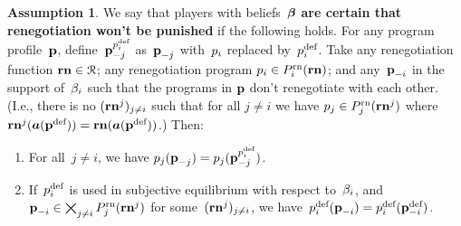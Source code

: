 \documentclass[sigconf]{aamas}
\theoremstyle{definition}
\newtheorem{assumption}[definition]{Assumption}
\begin{document}
\begin{assumption}
We say that players with beliefs~$\boldsymbol{\beta}$
\textbf{are certain 
that renegotiation won't be punished}
if the following holds. For any program profile~$\textbf{p}$, define~$\textbf{p}_{-j}^{p_i^{\textnormal{def}}}$ as~$\textbf{p}_{-j}$ 
    with~$p_i$ replaced by~$p_i^{\textnormal{def}}$.
    Take any renegotiation function $\mathbf{rn} \in \mathcal{R}$;
    any renegotiation program
    $p_i \in P_i^{\textnormal{rn}}(\mathbf{rn})$;
    and any~$\textbf{p}_{-i}$ in the support of~$\beta_i$
    such that the programs in $\textbf{p}$ don't renegotiate with each other.
    (I.e.,
    there is no $(\mathbf{rn}^j)_{j \neq i}$
    such that for all $j \neq i$
    we have
    $p_j \in P_j^{\textnormal{rn}}(\mathbf{rn}^j)$
    where $\mathbf{rn}^j(\boldsymbol{a}({\textbf{p}}^{\textnormal{def}})) = \mathbf{rn}(\boldsymbol{a}({\textbf{p}}^{\textnormal{def}}))$.)
    Then:
    \begin{enumerate}
        \item For all~$j \neq i$, we have $p_j(\textbf{p}_{-j}) = p_j(\textbf{p}_{-j}^{p_i^{\textnormal{def}}})$.
        \item If~$p_i^{\textnormal{def}}$ is used in subjective equilibrium with respect
        to~$\beta_i$,
        and
        $\textbf{p}_{-i} \in \bigtimes_{j \neq i} P_j^{\textnormal{rn}}(\mathbf{rn}^j)$ for some~$(\mathbf{rn}^j)_{j \neq i}$,
        we have~$p_i^{\textnormal{def}}(\textbf{p}_{-i}) = p_i^{\textnormal{def}}({\textbf{p}}^{\textnormal{def}}_{-i})$.
    \end{enumerate}
\end{assumption}
\end{document}
